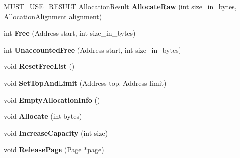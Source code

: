 \begin{DoxyCompactItemize}
\item 
M\+U\+S\+T\+\_\+\+U\+S\+E\+\_\+\+R\+E\+S\+U\+LT \hyperlink{classv8_1_1internal_1_1_allocation_result}{Allocation\+Result} {\bfseries Allocate\+Raw} (int size\+\_\+in\+\_\+bytes, Allocation\+Alignment alignment)\hypertarget{classv8_1_1internal_1_1_paged_space_a190586880dfb86739d285b2f8ae4ad69}{}\label{classv8_1_1internal_1_1_paged_space_a190586880dfb86739d285b2f8ae4ad69}

\item 
int {\bfseries Free} (Address start, int size\+\_\+in\+\_\+bytes)\hypertarget{classv8_1_1internal_1_1_paged_space_a5429d1ccf9df8d6ff945030c78e63618}{}\label{classv8_1_1internal_1_1_paged_space_a5429d1ccf9df8d6ff945030c78e63618}

\item 
int {\bfseries Unaccounted\+Free} (Address start, int size\+\_\+in\+\_\+bytes)\hypertarget{classv8_1_1internal_1_1_paged_space_a57f2bd735fd0da6cbf185a3888b40543}{}\label{classv8_1_1internal_1_1_paged_space_a57f2bd735fd0da6cbf185a3888b40543}

\item 
void {\bfseries Reset\+Free\+List} ()\hypertarget{classv8_1_1internal_1_1_paged_space_a717b2939aec984ef6c6517c3195b0923}{}\label{classv8_1_1internal_1_1_paged_space_a717b2939aec984ef6c6517c3195b0923}

\item 
void {\bfseries Set\+Top\+And\+Limit} (Address top, Address limit)\hypertarget{classv8_1_1internal_1_1_paged_space_a38490a7005e01afa669c4abf3aa8b923}{}\label{classv8_1_1internal_1_1_paged_space_a38490a7005e01afa669c4abf3aa8b923}

\item 
void {\bfseries Empty\+Allocation\+Info} ()\hypertarget{classv8_1_1internal_1_1_paged_space_a7907a19e0f44a960dbda34767627d9f0}{}\label{classv8_1_1internal_1_1_paged_space_a7907a19e0f44a960dbda34767627d9f0}

\item 
void {\bfseries Allocate} (int bytes)\hypertarget{classv8_1_1internal_1_1_paged_space_a64fdb7e87da1e0eed6f3f79c79a0c1cf}{}\label{classv8_1_1internal_1_1_paged_space_a64fdb7e87da1e0eed6f3f79c79a0c1cf}

\item 
void {\bfseries Increase\+Capacity} (int size)\hypertarget{classv8_1_1internal_1_1_paged_space_acbef3b415e3be1968f360554213886b4}{}\label{classv8_1_1internal_1_1_paged_space_acbef3b415e3be1968f360554213886b4}

\item 
void {\bfseries Release\+Page} (\hyperlink{classv8_1_1internal_1_1_page}{Page} $\ast$page)\hypertarget{classv8_1_1internal_1_1_paged_space_aa3530ad4022aca5a8e5417220d45f4a8}{}\label{classv8_1_1internal_1_1_paged_space_aa3530ad4022aca5a8e5417220d45f4a8}


\end{DoxyCompactItemize}
